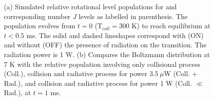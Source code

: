 \begin{figure}[!htb]
    \hfill
    
    \caption{(a) Simulated relative rotational level populations for \CD and corresponding number $J$ levels as labelled in parenthesis. The population evolves from $t=0$ (T$_{coll}=300$ K) to reach equilibrium at $t<0.5$ ms. The solid and dashed lineshapes correspond with (ON) and without (OFF) the presence of radiation on the \CD \CDline transition. The radiation power is 1 W. (b) Compares the Boltzmann distribution at 7 K with the relative population involving only collisional process (Coll.), collision and radiative process for power $3.5\ \mu$W (Coll. + Rad.), and collision and radiative process for power 1 W (Coll. $\ll$ Rad.), at $t=1$ ms.}
    \label{fig:ROSAA-sim-coll-rad-population-boltzmann-higher-rad}
\end{figure}